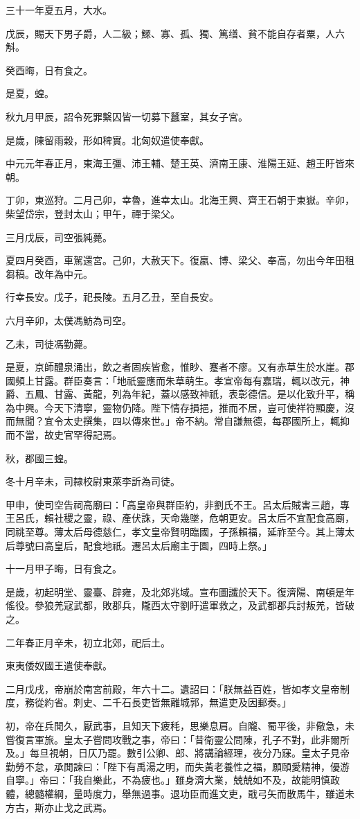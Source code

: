 \begin{pinyinscope}
三十一年夏五月，大水。

戊辰，賜天下男子爵，人二級；鰥、寡、孤、獨、篤缮、貧不能自存者粟，人六斛。

癸酉晦，日有食之。

是夏，蝗。

秋九月甲辰，詔令死罪繫囚皆一切募下蠶室，其女子宮。

是歲，陳留雨穀，形如稗實。北匈奴遣使奉獻。

中元元年春正月，東海王彊、沛王輔、楚王英、濟南王康、淮陽王延、趙王盱皆來朝。

丁卯，東巡狩。二月己卯，幸魯，進幸太山。北海王興、齊王石朝于東嶽。辛卯，柴望岱宗，登封太山；甲午，禪于梁父。

三月戊辰，司空張純薨。

夏四月癸酉，車駕還宮。己卯，大赦天下。復嬴、博、梁父、奉高，勿出今年田租芻稿。改年為中元。

行幸長安。戊子，祀長陵。五月乙丑，至自長安。

六月辛卯，太僕馮魴為司空。

乙未，司徒馮勤薨。

是夏，京師醴泉涌出，飲之者固疾皆愈，惟眇、蹇者不瘳。又有赤草生於水崖。郡國頻上甘露。群臣奏言：「地祇靈應而朱草萌生。孝宣帝每有嘉瑞，輒以改元，神爵、五鳳、甘露、黃龍，列為年紀，蓋以感致神祇，表彰德信。是以化致升平，稱為中興。今天下清寧，靈物仍降。陛下情存損挹，推而不居，豈可使祥符顯慶，沒而無聞？宜令太史撰集，四以傳來世。」帝不納。常自謙無德，每郡國所上，輒抑而不當，故史官罕得記焉。

秋，郡國三蝗。

冬十月辛未，司隸校尉東萊李訢為司徒。

甲申，使司空告祠高廟曰：「高皇帝與群臣約，非劉氏不王。呂太后賊害三趙，專王呂氏，賴社稷之靈，祿、產伏誅，天命幾墜，危朝更安。呂太后不宜配食高廟，同祧至尊。薄太后母德慈仁，孝文皇帝賢明臨國，子孫賴福，延祚至今。其上薄太后尊號曰高皇后，配食地祇。遷呂太后廟主于園，四時上祭。」

十一月甲子晦，日有食之。

是歲，初起明堂、靈臺、辟雍，及北郊兆域。宣布圖讖於天下。復濟陽、南頓是年傜役。參狼羌寇武都，敗郡兵，隴西太守劉盱遣軍救之，及武都郡兵討叛羌，皆破之。

二年春正月辛未，初立北郊，祀后土。

東夷倭奴國王遣使奉獻。

二月戊戌，帝崩於南宮前殿，年六十二。遺詔曰：「朕無益百姓，皆如孝文皇帝制度，務從約省。刺史、二千石長吏皆無離城郭，無遣吏及因郵奏。」

初，帝在兵閒久，厭武事，且知天下疲秏，思樂息肩。自隴、蜀平後，非儆急，未嘗復言軍旅。皇太子嘗問攻戰之事，帝曰：「昔衛靈公問陳，孔子不對，此非爾所及。」每旦視朝，日仄乃罷。數引公卿、郎、將講論經理，夜分乃寐。皇太子見帝勤勞不怠，承閒諫曰：「陛下有禹湯之明，而失黃老養性之福，願頤愛精神，優游自寧。」帝曰：「我自樂此，不為疲也。」雖身濟大業，兢兢如不及，故能明慎政體，總髓權綱，量時度力，舉無過事。退功臣而進文吏，戢弓矢而散馬牛，雖道未方古，斯亦止戈之武焉。


\end{pinyinscope}
